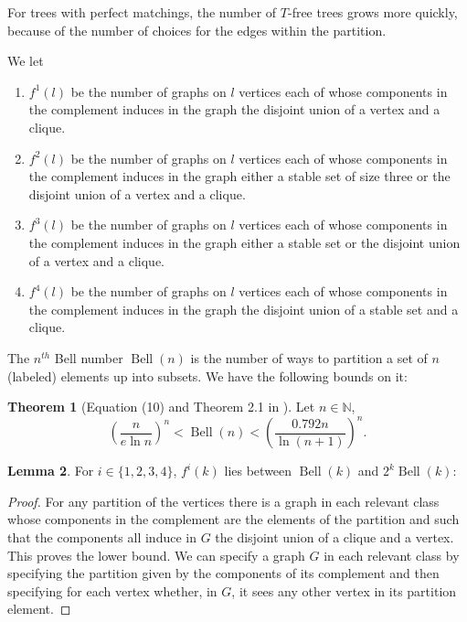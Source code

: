\documentclass[12pt]{article}
\theoremstyle{definition}
\newtheorem{theorem}{Theorem}[section]
\newtheorem{lemma}[theorem]{Lemma}
\DeclareMathOperator{\Bell}{Bell}
\begin{document}
For trees with perfect matchings, the number of $T$-free trees grows more quickly, because of the number of choices for the edges 
within the partition. 

We let 
\begin{enumerate}
\item $f^1(l)$ be the number of graphs on $l$ vertices each of whose components in the complement induces in the graph the disjoint union of a 
vertex and a clique.
\item $f^2(l)$ be the number of graphs on $l$ vertices each of whose components in the complement induces  in the graph  either a stable set of size three 
or the disjoint union of a vertex and a clique. 
\item $f^3(l)$ be the number of graphs on $l$ vertices each of whose components in the complement induces  in the graph  either a stable set  
or the disjoint union of a vertex and a clique. 
\item $f^4(l)$ be the number of graphs on $l$ vertices each of whose components in the complement induces  in the graph 
 the disjoint union of a stable set  and a clique. 
\end{enumerate} 


The $n^{th}$ Bell number $\Bell(n)$ is the number of ways to partition a set of $n$  (labeled) elements up into 
subsets. We have the following bounds on it:

\begin{theorem} [Equation (10) and Theorem 2.1 in \cite{BT10}] \label{Bell}
Let $n\in \mathbb{N}$, 
\[
\left(\frac{n}{e \ln n}\right)^n <\Bell(n) <\left(\frac{0.792n}{ \ln (n+1)}\right)^n.
\]
\end{theorem}





\begin{lemma}\label{graphcount}
For $i \in \{1,2,3,4\}$, $f^i(k)$  lies 
between $\Bell(k)$ and $2^k\Bell(k)$:
\end{lemma}

\begin{proof}
For any partition of the vertices  there is a graph in each  relevant class whose components in the complement  are the elements of the 
partition and such  that the components all induce in $G$ the disjoint union of a clique and a vertex. 
This proves the lower bound. 
We can specify a graph $G$  in each  relevant class by specifying the partition given by the components of 
its  complement and then specifying for each vertex whether, in $G$,  it sees any other vertex in its partition 
element.  
\end{proof}
\end{document}
